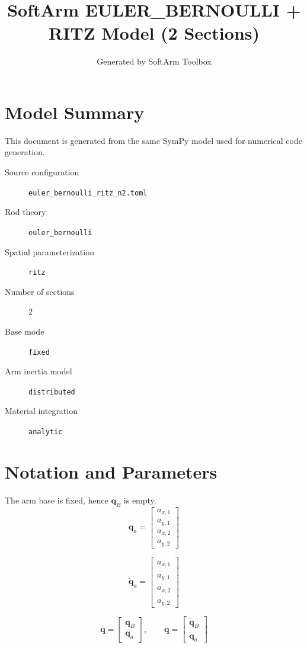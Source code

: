 \documentclass[11pt]{article}
\title{SoftArm EULER\_BERNOULLI + RITZ Model (2 Sections)}
\author{Generated by SoftArm Toolbox}
\date{}
\begin{document}
\maketitle

\section{Model Summary}
This document is generated from the same SymPy model used for numerical code generation.
\begin{description}
\item[Source configuration] \texttt{euler\_bernoulli\_ritz\_n2.toml}
\item[Rod theory] \texttt{euler\_bernoulli}
\item[Spatial parameterization] \texttt{ritz}
\item[Number of sections] 2
\item[Base mode] \texttt{fixed}
\item[Arm inertia model] \texttt{distributed}
\item[Material integration] \texttt{analytic}
\end{description}

\section{Notation and Parameters}
The arm base is fixed, hence $\boldsymbol q_B$ is empty.
\begin{equation}
\boldsymbol q_a=\begin{bmatrix}a_{x,1}\\a_{y,1}\\a_{x,2}\\a_{y,2}\end{bmatrix}
\end{equation}

\begin{equation}
\dot{\boldsymbol q}_a=\begin{bmatrix}\dot{a_{x,1}}\\\dot{a_{y,1}}\\\dot{a_{x,2}}\\\dot{a_{y,2}}\end{bmatrix}
\end{equation}

\begin{equation}
\boldsymbol q=\begin{bmatrix}\boldsymbol q_B\\\boldsymbol q_a\end{bmatrix},\qquad \dot{\boldsymbol q}=\begin{bmatrix}\dot{\boldsymbol q}_B\\\dot{\boldsymbol q}_a\end{bmatrix}
\end{equation}
\end{document}
